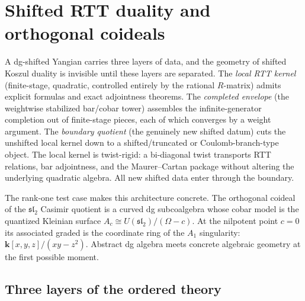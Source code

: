 
\section{Shifted RTT duality and orthogonal coideals}
\label{sec:shifted-rtt-duality-orthogonal-coideals}

A dg-shifted Yangian carries three layers of data, and the geometry of
shifted Koszul duality is invisible until these layers are separated.
The \emph{local RTT kernel} (finite-stage, quadratic, controlled
entirely by the rational $R$-matrix) admits explicit formulas and exact
adjointness theorems. The \emph{completed envelope} (the weightwise
stabilized bar/cobar tower) assembles the infinite-generator
completion out of finite-stage pieces, each of which converges by a
weight argument. The \emph{boundary quotient} (the genuinely new
shifted datum) cuts the unshifted local kernel down to a
shifted/truncated or Coulomb-branch-type object. The local kernel is
twist-rigid: a bi-diagonal twist transports RTT relations, bar
adjointness, and the Maurer--Cartan package without altering the
underlying quadratic algebra. All new shifted data enter through the
boundary.

The rank-one test case makes this architecture concrete. The
orthogonal coideal of the $\mathfrak{sl}_2$ Casimir quotient is a
curved dg subcoalgebra whose cobar model is the quantized Kleinian
surface $A_c \cong U(\mathfrak{sl}_2)/(\Omega - c)$. At the
nilpotent point $c = 0$ its associated graded is the coordinate ring
of the $A_1$ singularity:
$\mathbf{k}[x,y,z]/(xy - z^2)$. Abstract dg algebra meets concrete
algebraic geometry at the first possible moment.


\subsection{Three layers of the ordered theory}
\label{subsec:three-layers-ordered}

